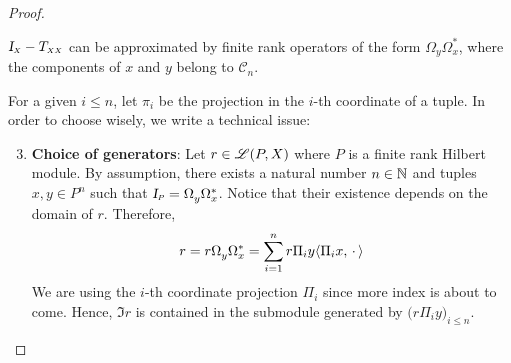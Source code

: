 \begin{lema}
\begin{proof}
\begin{itroman}
    \item \label{item: aproximacao de Id-T_XX} $\sub{\Id}{X}-\sub{T}{X X}$ can be approximated by finite rank operators of the form $\Omega_{y} \Omega_{x}^{*}$, where the components of $x$ and $y$ belong to ${\mathscr C}_n$.
\end{itroman}
For a given $i \leqslant n$, let $\pi_i$ be the projection in the $i$-th coordinate of a tuple. In order to choose wisely, we write a technical issue:
\begin{enumerate}[label=\ensuremath{(\roman*)}]
    \setcounter{enumi}{2}
    \item \textbf{Choice of generators}: Let $r\in \mathscr L(P,X)$ where $P$ is a finite rank Hilbert module. By assumption, there exists a natural number $n \in \operatorname{\mathbb{N}}$ and tuples $x, y \in P^{n}$ such that $\sub\Id{P} = \Omega^{\vphantom{*}}_{y} \Omega_{x}^*$. Notice that their existence depends on the domain of $r$.  Therefore,
\[
r = r\Omega^{\vphantom{*}}_{y} \Omega_{x}^* = \sum_{i=1}^{n} r\Pi_iy\langle {\Pi_ix},{\operatorname{\,\cdot\,}}\rangle
\]
    We are using the $i$-th coordinate projection $\Pi_i$ since more index is about to come. Hence, $\Im r$ is contained in the submodule generated by $\big(r\Pi_iy\big)_{i \leq n}$.
\end{enumerate}


\end{proof}
\end{lema}
